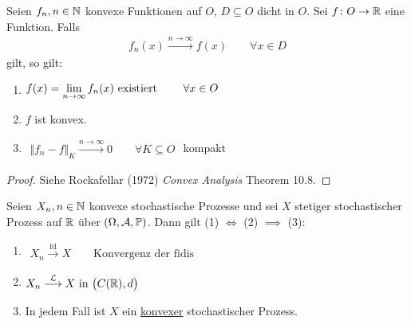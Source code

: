 \begin{theorem}\label{theorem9.8}
	Seien $f_n,n\in\mathbb{N}$ konvexe Funktionen auf $O$, $D\subseteq O$ dicht in $O$.
	Sei $f\colon O\to\mathbb{R}$ eine Funktion.
	Falls 
	\begin{align}\label{eqtheorem9.8Stern}\tag{$\ast$}
		f_n(x)\overset{n\to\infty}{\longrightarrow} f(x)\qquad\forall x\in D
	\end{align}
	gilt, so gilt:
	\begin{enumerate}[label=(\arabic*)]
		\item $\begin{aligned}
			f(x)=\lim\limits_{n\to\infty} f_n(x)\text{ existiert }\qquad\forall x\in O
		\end{aligned}$
		\item $f$ ist konvex.
		\item $\begin{aligned}
			\big\Vert f_n-f\big\Vert_K\overset{n\to\infty}{\longrightarrow}0\qquad\forall K\subseteq O
		\end{aligned}$ kompakt
	\end{enumerate}
\end{theorem}


\begin{proof}
	Siehe Rockafellar (1972) \textit{Convex Analysis} Theorem 10.8.
\end{proof}

\begin{satz}\label{satz9.9}
	Seien $X_n,n\in\mathbb{N}$ konvexe stochastische Prozesse und sei $X$ stetiger stochastischer Prozess auf $\mathbb{R}$ über $(\Omega,\mathcal{A},\mathbb{P})$.
	Dann gilt (1) $\Longleftrightarrow$ (2) $\implies$ (3):
	\begin{enumerate}[label=(\arabic*)]
		\item $\begin{aligned}
			X_n\overset{\text{fd}}{\longrightarrow}X\qquad\text{Konvergenz der fidis}
		\end{aligned}$
		\item $\begin{aligned}
			X_n\overset{\mathcal{L}}{\longrightarrow} X\text{ in }\big(C(\mathbb{R}),d\big)
		\end{aligned}$
		\item In jedem Fall ist $X$ ein \underline{konvexer} stochastischer Prozess.
	\end{enumerate}
\end{satz}


